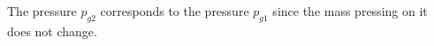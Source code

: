 The pressure \( p_{g2} \) corresponds to the pressure \( p_{g1} \) since the mass pressing on it does not change.